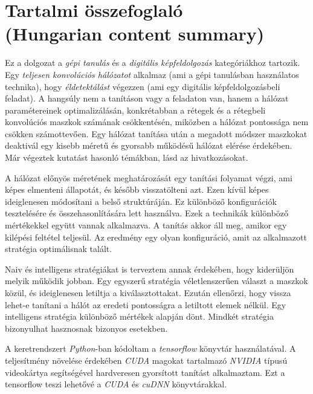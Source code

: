 \documentclass[12pt]{report}
\begin{document}
\begingroup
	\hypersetup{hidelinks}
	\tableofcontents
\endgroup


\chapter*{Tartalmi összefoglaló\\(Hungarian content summary)}

Ez a dolgozat a \textit{gépi tanulás} és a \textit{digitális képfeldolgozás} kategóriákhoz tartozik. Egy \textit{teljesen konvolúciós hálózatot} alkalmaz (ami a gépi tanulásban használatos technika), hogy \textit{éldetektálást} végezzen (ami egy digitális képfeldolgozásbeli feladat). A hangsúly nem a tanításon vagy a feladaton van, hanem a hálózat paramétereinek optimalizálásán, konkrétabban a rétegek és a rétegbeli konvolúciós maszkok számának csökkentésén, miközben a hálózat pontossága nem csökken számottevően. Egy hálózat tanítása után a megadott módszer maszkokat deaktivál egy kisebb méretű és gyorsabb működésű hálózat elérése érdekében. Már végeztek kutatást hasonló témákban, lásd az \cite{pruning_web, pruning_arxiv, understanding} hivatkozásokat.

A hálózat előnyös méretének meghatározását egy tanítási folyamat végzi, ami képes elmenteni állapotát, és később visszatölteni azt. Ezen kívül képes ideiglenesen módosítani a belső struktúráján. Ez különböző konfigurációk tesztelésére és összehasonlítására lett használva. Ezek a technikák különböző mértékekkel együtt vannak alkalmazva. A tanítás akkor áll meg, amikor egy kilépési feltétel teljesül. Az eredmény egy olyan konfiguráció, amit az alkalmazott stratégia optimálisnak talált.

Naiv és intelligens stratégiákat is terveztem annak érdekében, hogy kiderüljön melyik működik jobban. Egy egyszerű stratégia véletlenszerűen választ a maszkok közül, és ideiglenesen letiltja a kiválasztottakat. Ezután ellenőrzi, hogy vissza lehet-e tanítani a hálót az eredeti pontosságra a letiltott elemek nélkül. Egy intelligens stratégia különböző mértékek alapján dönt. Mindkét stratégia bizonyulhat hasznosnak bizonyos esetekben.

A keretrendszert \textit{Python}-ban kódoltam a \textit{tensorflow} könyvtár \cite{tensorflow2015-whitepaper} használatával. A teljesítmény növelése érdekében \textit{CUDA} magokat tartalmazó \textit{NVIDIA} típusú videokártya segítségével hardveresen gyorsított tanítást alkalmaztam. Ezt a tensorflow teszi lehetővé a \textit{CUDA} és \textit{cuDNN} könyvtárakkal.
\end{document}
